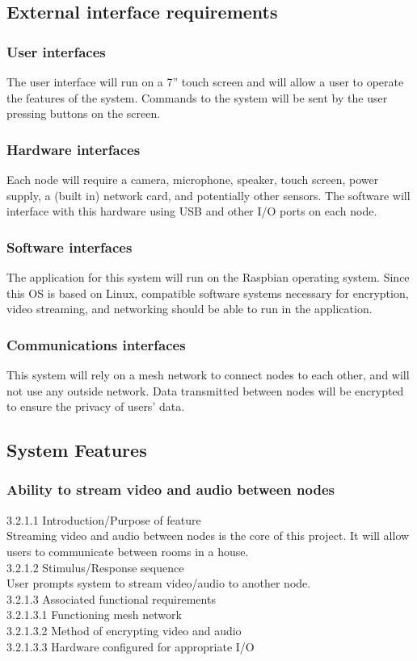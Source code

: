 \documentclass[onecolumn, draftclsnofoot,10pt, compsoc]{IEEEtran}
\newcommand\tab[1][1cm]{\hspace*{#1}}
\begin{document}
\subsection{External interface requirements}
\subsubsection{User interfaces}
The user interface will run on a 7” touch screen and will allow a user to operate the features of the system. Commands to the system will be sent by the user pressing buttons on the screen.

\subsubsection{Hardware interfaces}
Each node will require a camera, microphone, speaker, touch screen, power supply, a (built in) network card, and potentially other sensors. The software will interface with this hardware using USB and other I/O ports on each node. 

\subsubsection{Software interfaces}
The application for this system will run on the Raspbian operating system. Since this OS is based on Linux, compatible software systems necessary for encryption, video streaming, and networking should be able to run in the application. 

\subsubsection{Communications interfaces}
This system will rely on a mesh network to connect nodes to each other, and will not use any outside network. Data transmitted between nodes will be encrypted to ensure the privacy of users’ data. 

\subsection{System Features}

\subsubsection{Ability to stream video and audio between nodes}
\tab 3.2.1.1  Introduction/Purpose of feature \\
\tab Streaming video and audio between nodes is the core of this project. It will allow users to communicate between rooms in a house. \\ 
\tab 3.2.1.2  Stimulus/Response sequence \\
\tab User prompts system to stream video/audio to another node. \\ 
\tab 3.2.1.3  Associated functional requirements \\
\tab \tab 3.2.1.3.1  Functioning mesh network \\
\tab \tab 3.2.1.3.2  Method of encrypting video and audio \\
\tab \tab 3.2.1.3.3  Hardware configured for appropriate I/O
\end{document}
